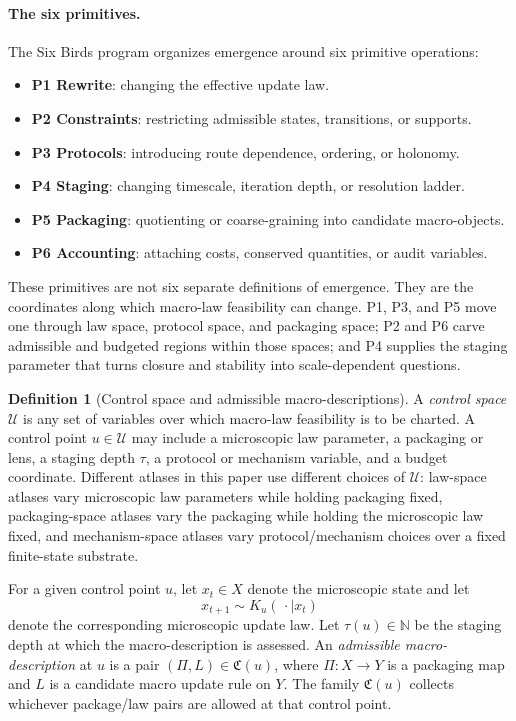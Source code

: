 \documentclass[11pt]{article}
\theoremstyle{definition}
\newtheorem{definition}{Definition}[section]
\begin{document}
\paragraph{The six primitives.}
The Six Birds program organizes emergence around six primitive operations:
\begin{itemize}
    \item \textbf{P1 Rewrite}: changing the effective update law.
    \item \textbf{P2 Constraints}: restricting admissible states, transitions, or supports.
    \item \textbf{P3 Protocols}: introducing route dependence, ordering, or holonomy.
    \item \textbf{P4 Staging}: changing timescale, iteration depth, or resolution ladder.
    \item \textbf{P5 Packaging}: quotienting or coarse-graining into candidate macro-objects.
    \item \textbf{P6 Accounting}: attaching costs, conserved quantities, or audit variables.
\end{itemize}
These primitives are not six separate definitions of emergence. They are the coordinates along which macro-law feasibility can change. P1, P3, and P5 move one through law space, protocol space, and packaging space; P2 and P6 carve admissible and budgeted regions within those spaces; and P4 supplies the staging parameter that turns closure and stability into scale-dependent questions.

\begin{definition}[Control space and admissible macro-descriptions]\label{def:control_space}
A \emph{control space} $\mathcal{U}$ is any set of variables over which macro-law feasibility is to be charted. A control point $u \in \mathcal{U}$ may include a microscopic law parameter, a packaging or lens, a staging depth $\tau$, a protocol or mechanism variable, and a budget coordinate. Different atlases in this paper use different choices of $\mathcal{U}$: law-space atlases vary microscopic law parameters while holding packaging fixed, packaging-space atlases vary the packaging while holding the microscopic law fixed, and mechanism-space atlases vary protocol/mechanism choices over a fixed finite-state substrate.

For a given control point $u$, let $x_t \in X$ denote the microscopic state and let
\[
x_{t+1} \sim K_u(\,\cdot \mid x_t)
\]
denote the corresponding microscopic update law. Let $\tau(u) \in \mathbb{N}$ be the staging depth at which the macro-description is assessed. An \emph{admissible macro-description} at $u$ is a pair $(\Pi,L) \in \mathfrak{C}(u)$, where $\Pi : X \to Y$ is a packaging map and $L$ is a candidate macro update rule on $Y$. The family $\mathfrak{C}(u)$ collects whichever package/law pairs are allowed at that control point.
\end{definition}
\end{document}
